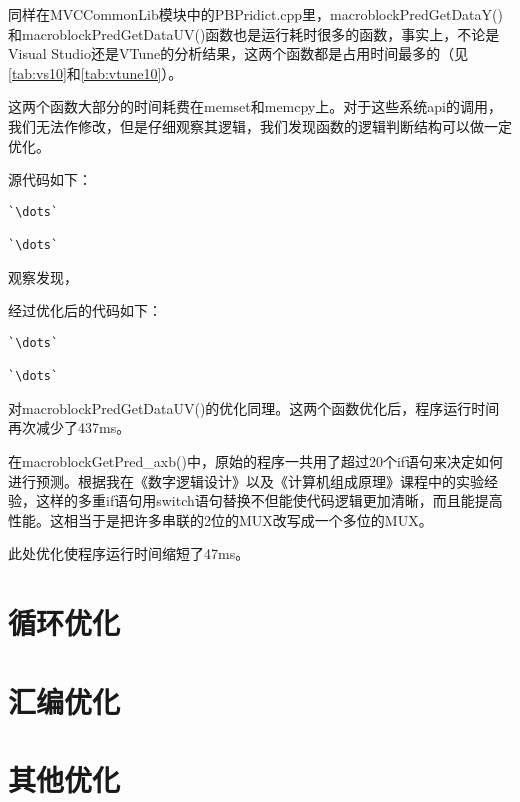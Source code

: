 同样在MVCCommonLib模块中的PBPridict.cpp里，macroblockPredGetDataY()和macroblockPredGetDataUV()函数也是运行耗时很多的函数，事实上，不论是Visual Studio还是VTune的分析结果，这两个函数都是占用时间最多的（见\autoref{tab:vs10}和\autoref{tab:vtune10}）。

这两个函数大部分的时间耗费在memset和memcpy上。对于这些系统api的调用，我们无法作修改，但是仔细观察其逻辑，我们发现函数的逻辑判断结构可以做一定优化。

源代码如下：

\begin{lstlisting}[caption = {macroblockPredGetDataY()函数片段（优化前）}, label = lst:macroblockPredGetDataYorig]
`\dots`

`\dots`
\end{lstlisting}

观察发现，

经过优化后的代码如下：

\begin{lstlisting}[caption = {macroblockPredGetDataY()函数片段（优化后）}, label = lst:macroblockPredGetDataYopt]
`\dots`

`\dots`
\end{lstlisting}

对macroblockPredGetDataUV()的优化同理。这两个函数优化后，程序运行时间再次减少了437ms。

在macroblockGetPred\_axb()中，原始的程序一共用了超过20个if语句来决定如何进行预测。根据我在《数字逻辑设计》以及《计算机组成原理》课程中的实验经验，这样的多重if语句用switch语句替换不但能使代码逻辑更加清晰，而且能提高性能。这相当于是把许多串联的2位的MUX改写成一个多位的MUX。

此处优化使程序运行时间缩短了47ms。

\section{循环优化}
\label{sec:singlecoreloopopt}


\section{汇编优化}
\label{sec:singlecoreasmopt}


\section{其他优化}
\label{sec:singlecoreothers}

